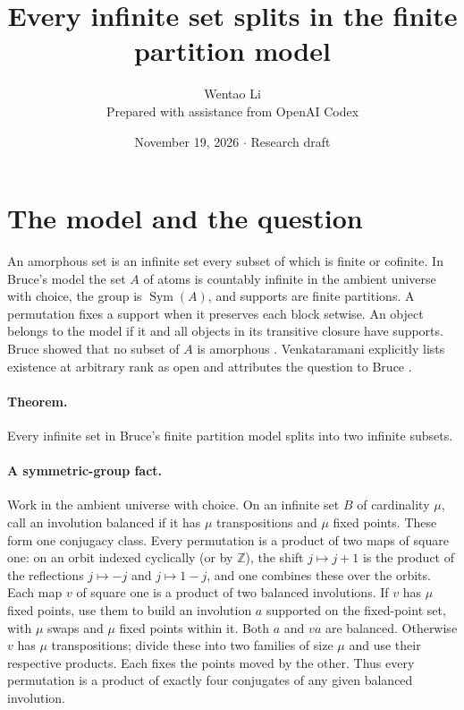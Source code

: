 \documentclass[11pt]{article}
\title{Every infinite set splits in the finite partition model}
\author{Wentao Li\\{\small Prepared with assistance from OpenAI Codex}}
\date{November 19, 2026 \quad $\cdot$ \quad Research draft}
\begin{document}
\maketitle
\section*{The model and the question}
An amorphous set is an infinite set every subset of which is finite or cofinite. In Bruce's model the set $A$ of atoms is countably infinite in the ambient universe with choice, the group is $\operatorname{Sym}(A)$, and supports are finite partitions. A permutation fixes a support when it preserves each block setwise. An object belongs to the model if it and all objects in its transitive closure have supports. Bruce showed that no subset of $A$ is amorphous \cite{bruce}. Venkataramani explicitly lists existence at arbitrary rank as open and attributes the question to Bruce \cite{ven}.

\paragraph{Theorem.} Every infinite set in Bruce's finite partition model splits into two infinite subsets.
\paragraph{A symmetric-group fact.} Work in the ambient universe with choice. On an infinite set $B$ of cardinality $\mu$, call an involution balanced if it has $\mu$ transpositions and $\mu$ fixed points. These form one conjugacy class. Every permutation is a product of two maps of square one: on an orbit indexed cyclically (or by $\mathbb Z$), the shift $j\mapsto j+1$ is the product of the reflections $j\mapsto-j$ and $j\mapsto1-j$, and one combines these over the orbits. Each map $v$ of square one is a product of two balanced involutions. If $v$ has $\mu$ fixed points, use them to build an involution $a$ supported on the fixed-point set, with $\mu$ swaps and $\mu$ fixed points within it. Both $a$ and $va$ are balanced. Otherwise $v$ has $\mu$ transpositions; divide these into two families of size $\mu$ and use their respective products. Each fixes the points moved by the other. Thus every permutation is a product of exactly four conjugates of any given balanced involution.
\end{document}
